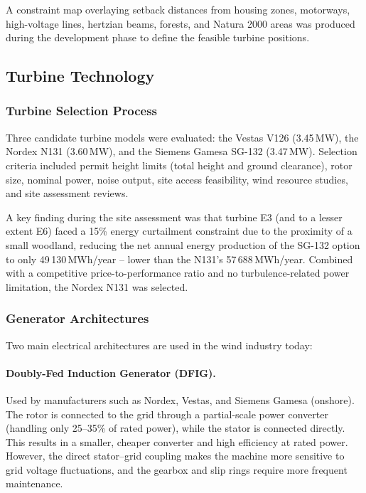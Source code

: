 A constraint map overlaying setback distances from housing zones, motorways, high-voltage
lines, hertzian beams, forests, and Natura 2000 areas was produced during the development
phase to define the feasible turbine positions.

\subsection{Turbine Technology}

\subsubsection{Turbine Selection Process}

Three candidate turbine models were evaluated: the Vestas V126 (3.45\,MW), the Nordex N131
(3.60\,MW), and the Siemens Gamesa SG-132 (3.47\,MW). Selection criteria included permit
height limits (total height and ground clearance), rotor size, nominal power, noise output,
site access feasibility, wind resource studies, and site assessment reviews.

A key finding during the site assessment was that turbine E3 (and to a lesser extent E6)
faced a 15\% energy curtailment constraint due to the proximity of a small woodland, reducing
the net annual energy production of the SG-132 option to only 49\,130\,MWh/year -- lower than
the N131's 57\,688\,MWh/year. Combined with a competitive price-to-performance ratio and no
turbulence-related power limitation, the Nordex N131 was selected.

\subsubsection{Generator Architectures}

Two main electrical architectures are used in the wind industry today:

\paragraph{Doubly-Fed Induction Generator (DFIG).}
Used by manufacturers such as Nordex, Vestas, and Siemens Gamesa (onshore). The rotor is
connected to the grid through a partial-scale power converter (handling only 25--35\% of
rated power), while the stator is connected directly. This results in a smaller, cheaper
converter and high efficiency at rated power. However, the direct stator--grid coupling makes
the machine more sensitive to grid voltage fluctuations, and the gearbox and slip rings
require more frequent maintenance.

